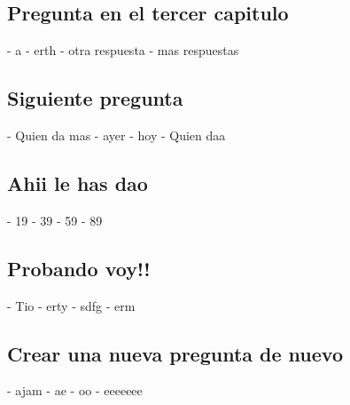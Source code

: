 \documentclass{article}%
\begin{document}
%
\subsection{Pregunta en el tercer capitulo}%
{-} a \newline%
%
{-} erth \newline%
%
{-} otra respuesta \newline%
%
{-} mas respuestas \newline%

%
\subsection{Siguiente pregunta}%
{-} Quien da mas \newline%
%
{-} ayer \newline%
%
{-} hoy \newline%
%
{-} Quien daa \newline%

%
\subsection{Ahii le has dao}%
{-} 19 \newline%
%
{-} 39 \newline%
%
{-} 59 \newline%
%
{-} 89 \newline%

%
\subsection{Probando voy!!}%
{-} Tio \newline%
%
{-} erty \newline%
%
{-} sdfg \newline%
%
{-} erm \newline%

%
\subsection{Crear una nueva pregunta de nuevo}%
{-} ajam \newline%
%
{-} ae \newline%
%
{-} oo \newline%
%
{-} eeeeeee \newline%

%
\end{document}
